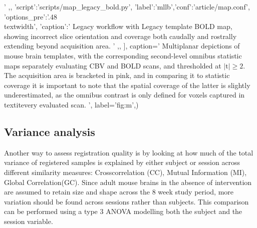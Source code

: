 {{                                '
			,},
		{'script':'scripts/map_legacy_bold.py', 'label':'mllb','conf':'article/map.conf', 'options_pre':'{.48\\textwidth}',
			'caption':'
				Legacy workflow with Legacy template BOLD map, showing incorrect slice orientation and coverage both caudally and rostrally extending beyond acquisition area.
			        '
                        ,},
		],
	caption='
                Multiplanar depictions of mouse brain templates, with the corresponding second-level omnibus statistic maps separately evaluating CBV and BOLD scans, and thresholded at $\mathrm{|t|\geq2}$.
                The acquisition area is bracketed in pink, and in comparing it to statistic coverage it is important to note that the spatial coverage of the latter is slightly underestimated, as the omnibus contrast is only defined for voxels captured in \\textit{every} evaluated scan.
                ',
	label='fig:m',)}

\clearpage

\subsection{Variance analysis}

\begin{sansmath}
\end{sansmath}

Another way to assess registration quality is by looking at how much of the total variance of registered samples is explained by either subject or session across different similarity measures:
Crosscorrelation (CC), Mutual Information (MI), Global Correlation(GC).
Since adult mouse brains in the absence of intervention are assumed to retain size and shape across the 8 week study period, more variation should be found across sessions rather than subjects.
This comparison can be performed using a type 3 ANOVA modelling both the subject and the session variable.

